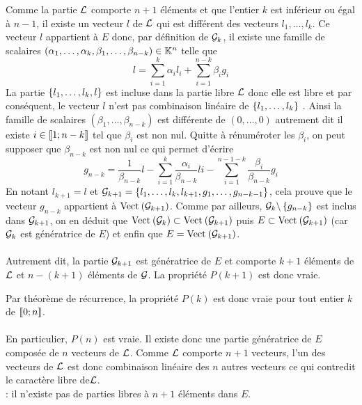 \begin{dem}
\begin{itemize}
\begin{itemize}
            Comme la partie \(\cal{L}\) comporte \(n + 1\) éléments et que l’entier \(k\) est inférieur ou égal à \(n - 1\), il existe un vecteur \(l\) de \(\cal{L}\) qui est différent des vecteurs \(l_1, \dots , l_k\). Ce vecteur \(l\) appartient à \(E\) donc, par définition de \(\cal{G}_k\), il existe une famille de scalaires \((\alpha_1, \dots , \alpha_k, \beta_1, \dots , \beta_{n-k}) \in \K^n\) telle que
            \[l = \sum^k_{i=1} \alpha_il_i + \sum^{n-k}_{i=1} \beta_ig_i\]
            La partie \(\accol{l_1, \dots , l_k, l}\) est incluse dans la partie libre \(\cal{L}\) donc elle est libre et par conséquent, le vecteur \(l\) n’est pas combinaison linéaire de \(\accol{l_1, \dots , l_k}\) . Ainsi la famille de scalaires \((\beta_1, \dots , \beta_{n-k})\) est différente de \((0, \dots , 0)\) autrement dit il existe \(i \in \interventierii{1}{n-k}\) tel que \(\beta_i\) est non nul. Quitte à rénuméroter les \(\beta_i\), on peut supposer que \(\beta_{n-k}\) est non nul ce qui permet d’écrire
            \[g_{n-k} = \frac{1}{\beta_{n-k}}l - \sum^{k}_{i=1} \frac{\alpha_i}{\beta_{n-k}}li - \sum^{n-1-k}_{i=1}\frac{\beta_i}{\beta_{n-k}}g_i\]
            En notant \(l_{k+1} = l\) et \(\cal{G}_{k+1} = \accol{l_1, \dots , l_k, l_{k+1}, g_1, \dots , g_{n-k-1}}\), cela prouve que le vecteur \(g_{n-k}\) appartient à \(\Vect{\cal{G}_{k+1}}\). Comme par ailleurs, \(\cal{G}_k \pd \accol{g_{n-k}}\) est inclus dans \(\cal{G}_{k+1}\), on en déduit que \(\Vect{\cal{G}_k} \subset \Vect{\cal{G}_{k+1}}\) puis \(E \subset \Vect{\cal{G}_{k+1}}\) (car \(\cal{G}_k\) est génératrice de \(E\)) et enfin que \(E = \Vect{\cal{G}_{k+1}}\).\\~\\
            Autrement dit, la partie \(\cal{G}_{k+1}\) est génératrice de \(E\) et comporte \(k + 1\) éléments de \(\cal{L}\) et \(n - (k + 1)\) éléments de \(\cal{G}\). La propriété \(P(k + 1)\) est donc vraie.
        \end{itemize}
        Par théorème de récurrence, la propriété \(P(k)\) est donc vraie pour tout entier \(k\) de \(\interventierii{0}{n}\).\\~\\
        En particulier, \(P(n)\) est vraie. Il existe donc une partie génératrice de \(E\) composée de \(n\) vecteurs de \(\cal{L}\). Comme \(\cal{L}\) comporte \(n + 1\) vecteurs, l’un des vecteurs de \(\cal{L}\) est donc combinaison linéaire des \(n\) autres vecteurs ce qui contredit le caractère libre de\( \cal{L}\).\\
        \conclusion : il n’existe pas de parties libres à \(n + 1\) éléments dans \(E\).

\end{itemize}
\end{dem}
